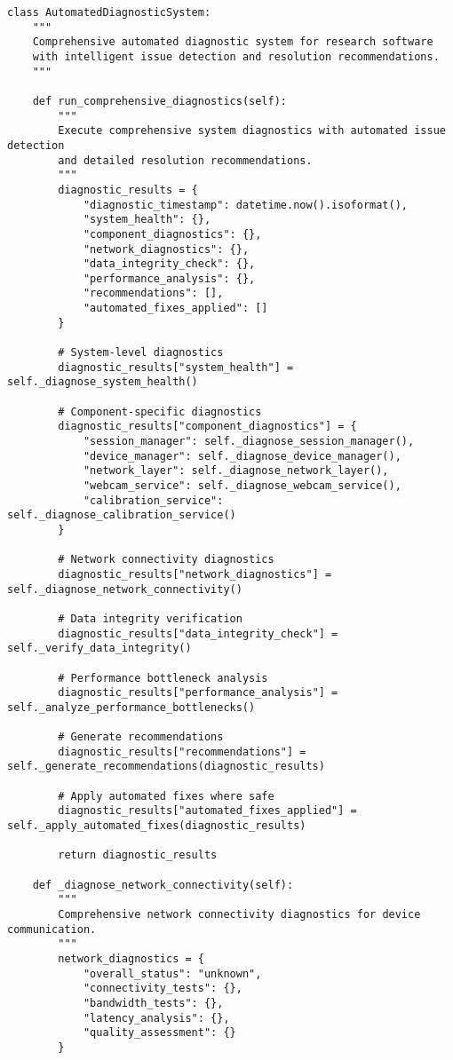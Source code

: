\documentclass[11pt,a4paper]{article}
\begin{document}
\begin{verbatim}
class AutomatedDiagnosticSystem:
    """
    Comprehensive automated diagnostic system for research software
    with intelligent issue detection and resolution recommendations.
    """

    def run_comprehensive_diagnostics(self):
        """
        Execute comprehensive system diagnostics with automated issue detection
        and detailed resolution recommendations.
        """
        diagnostic_results = {
            "diagnostic_timestamp": datetime.now().isoformat(),
            "system_health": {},
            "component_diagnostics": {},
            "network_diagnostics": {},
            "data_integrity_check": {},
            "performance_analysis": {},
            "recommendations": [],
            "automated_fixes_applied": []
        }

        # System-level diagnostics
        diagnostic_results["system_health"] = self._diagnose_system_health()

        # Component-specific diagnostics
        diagnostic_results["component_diagnostics"] = {
            "session_manager": self._diagnose_session_manager(),
            "device_manager": self._diagnose_device_manager(),
            "network_layer": self._diagnose_network_layer(),
            "webcam_service": self._diagnose_webcam_service(),
            "calibration_service": self._diagnose_calibration_service()
        }

        # Network connectivity diagnostics
        diagnostic_results["network_diagnostics"] = self._diagnose_network_connectivity()

        # Data integrity verification
        diagnostic_results["data_integrity_check"] = self._verify_data_integrity()

        # Performance bottleneck analysis
        diagnostic_results["performance_analysis"] = self._analyze_performance_bottlenecks()

        # Generate recommendations
        diagnostic_results["recommendations"] = self._generate_recommendations(diagnostic_results)

        # Apply automated fixes where safe
        diagnostic_results["automated_fixes_applied"] = self._apply_automated_fixes(diagnostic_results)

        return diagnostic_results

    def _diagnose_network_connectivity(self):
        """
        Comprehensive network connectivity diagnostics for device communication.
        """
        network_diagnostics = {
            "overall_status": "unknown",
            "connectivity_tests": {},
            "bandwidth_tests": {},
            "latency_analysis": {},
            "quality_assessment": {}
        }


\end{verbatim}
\end{document}
